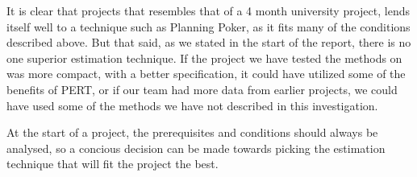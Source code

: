 It is clear that projects that resembles that of a 4 month university project, lends itself well to a technique such as Planning Poker, as it fits many of the conditions described above. But that said, as we stated in the start of the report, there is no one superior estimation technique. If the project we have tested the methods on was more compact, with a better specification, it could have utilized some of the benefits of PERT, or if our team had more data from earlier projects, we could have used some of the methods we have not described in this investigation. 

At the start of a project, the prerequisites and conditions should always be analysed, so a concious decision can be made towards picking the estimation technique that will fit the project the best.

